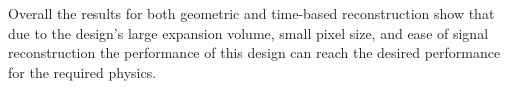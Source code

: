 Overall the results for both geometric and time-based reconstruction show that due to the design's large expansion volume, small pixel size, and ease of signal reconstruction the performance of this design can reach the desired performance for the required physics.
